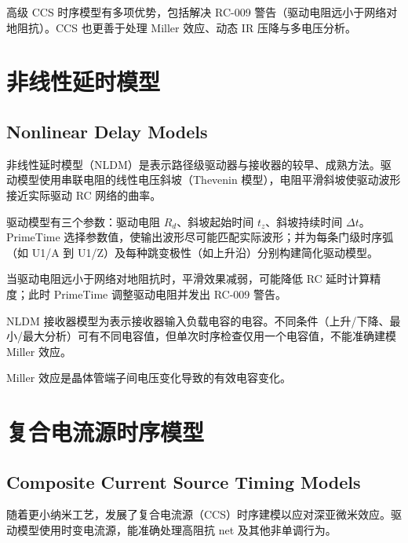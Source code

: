 高级 CCS 时序模型有多项优势，包括解决 RC-009 警告（驱动电阻远小于网络对地阻抗）。CCS 也更善于处理 Miller 效应、动态 IR 压降与多电压分析。

\section{非线性延时模型}
\subsection*{Nonlinear Delay Models}

非线性延时模型（NLDM）是表示路径级驱动器与接收器的较早、成熟方法。驱动模型使用串联电阻的线性电压斜坡（Thevenin 模型），电阻平滑斜坡使驱动波形接近实际驱动 RC 网络的曲率。


驱动模型有三个参数：驱动电阻 $R_d$、斜坡起始时间 $t_z$、斜坡持续时间 $\Delta t$。PrimeTime 选择参数值，使输出波形尽可能匹配实际波形；并为每条门级时序弧（如 U1/A 到 U1/Z）及每种跳变极性（如上升沿）分别构建简化驱动模型。

当驱动电阻远小于网络对地阻抗时，平滑效果减弱，可能降低 RC 延时计算精度；此时 PrimeTime 调整驱动电阻并发出 RC-009 警告。

NLDM 接收器模型为表示接收器输入负载电容的电容。不同条件（上升/下降、最小/最大分析）可有不同电容值，但单次时序检查仅用一个电容值，不能准确建模 Miller 效应。

\begin{noteBox}
Miller 效应是晶体管端子间电压变化导致的有效电容变化。
\end{noteBox}

\section{复合电流源时序模型}
\subsection*{Composite Current Source Timing Models}

随着更小纳米工艺，发展了复合电流源（CCS）时序建模以应对深亚微米效应。驱动模型使用时变电流源，能准确处理高阻抗 net 及其他非单调行为。


